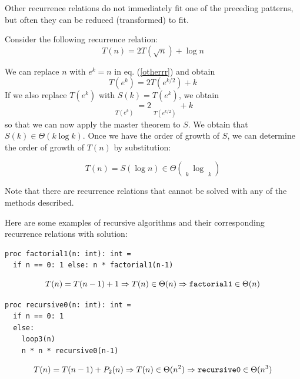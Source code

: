 \documentclass[justified, sixbynine]{tufte-book}
\def\stackunder#1#2{\mathrel{\mathop{#2}\limits_{#1}}}
\theoremstyle{plain}%
\newtheorem * {corollary}{Corollary}
\theoremstyle{definition}
\theoremstyle{remark}
\newtheorem * {remark}{Remark}
\newtheorem * {note}{Note}
\begin{document}
\begin{fullwidth}
Other recurrence relations do not immediately fit one of the preceding patterns, but often they can be reduced (transformed) to fit.

Consider the following recurrence relation:
\begin{equation}
T(n)=
2T(\sqrt{n})+\log n
\label{otherrr}
\end{equation}

We can replace $n$ with $e^k=n$ in eq. (\ref{otherrr}) and obtain
\begin{equation}
T(e^k)=
2T(e^{k/2})+k
\end{equation}
If we also replace $T(e^k)$ with $S(k)=T(e^k)$, we obtain
\begin{equation}
\stackunder{T(e^k)}{\underbrace{S(k)}}=
2\stackunder{T(e^{k/2})}{\underbrace{S(k/2)}}+k
\end{equation}
so that we can now apply the master theorem to $S$. We obtain that $S(k)\in
\Theta (k\log k)$. Once we have the order of growth of $S$, we can determine
the order of growth of $T(n)$ by substitution:

\begin{equation}
T(n)=S(\log n)\in \Theta (\stackunder{k}{\underbrace{\log n}}\log
\stackunder{k}{\underbrace{\log n}})
\end{equation}

Note that there are recurrence relations that cannot be solved with any of
the methods described.

Here are some examples of recursive algorithms and their corresponding recurrence relations with solution:

\begin{lstlisting}
proc factorial1(n: int): int =
  if n == 0: 1 else: n * factorial1(n-1)
\end{lstlisting}

\begin{equation}
T(n)=T(n-1)+1\Rightarrow T(n)\in \Theta (n)\Rightarrow \text{{\tt factorial1}%
}\in \Theta (n)
\end{equation}

\begin{lstlisting}
proc recursive0(n: int): int =
  if n == 0: 1
  else:
    loop3(n)
    n * n * recursive0(n-1)
\end{lstlisting}

\begin{equation}
T(n)=T(n-1)+P_2(n)\Rightarrow T(n)\in \Theta (n^2)\Rightarrow \text{{\tt %
recursive0}}\in \Theta (n^3)
\end{equation}


\end{fullwidth}
\end{document}
